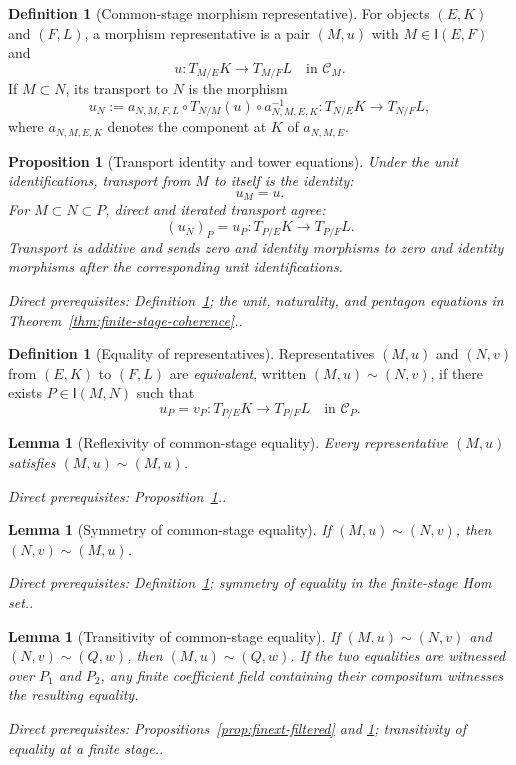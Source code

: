 \documentclass[10pt]{article}
\newtheorem{proposition}[theorem]{Proposition}
\newtheorem{lemma}[theorem]{Lemma}
\theoremstyle{definition}
\newtheorem{definition}[theorem]{Definition}
\newcommand{\depends}[1]{\par\smallskip\noindent\textit{Direct prerequisites:} #1.}
\begin{document}
\begin{definition}[Common-stage morphism representative]
\label{def:morphism-representative}
For objects $(E,K)$ and $(F,L)$, a morphism representative is a pair
$(M,u)$ with $M\in\mathsf I(E,F)$ and
\[
 u:T_{M/E}K\longrightarrow T_{M/F}L
 \quad\text{in }\mathcal C_M.
\]
If $M\subset N$, its transport to $N$ is the morphism
\[
 u_N:=
 a_{N,M,F,L}\circ T_{N/M}(u)\circ a_{N,M,E,K}^{-1}:
 T_{N/E}K\longrightarrow T_{N/F}L,
\]
where $a_{N,M,E,K}$ denotes the component at $K$ of
$a_{N,M,E}$.
\end{definition}

\begin{proposition}[Transport identity and tower equations]
\label{prop:transport-tower}
Under the unit identifications, transport from $M$ to itself is the identity:
\[
 u_M=u.
\]
For $M\subset N\subset P$, direct and iterated transport agree:
\[
 (u_N)_P=u_P:
 T_{P/E}K\longrightarrow T_{P/F}L.
\]
Transport is additive and sends zero and identity morphisms to zero and
identity morphisms after the corresponding unit identifications.
\depends{Definition~\ref{def:morphism-representative}; the unit, naturality,
and pentagon equations in Theorem~\ref{thm:finite-stage-coherence}.}
\end{proposition}

\begin{definition}[Equality of representatives]\label{def:representative-equality}
Representatives $(M,u)$ and $(N,v)$ from $(E,K)$ to $(F,L)$ are
\emph{equivalent}, written $(M,u)\sim(N,v)$, if there exists
$P\in\mathsf I(M,N)$ such that
\[
 u_P=v_P:T_{P/E}K\longrightarrow T_{P/F}L
 \quad\text{in }\mathcal C_P.
\]
\end{definition}

\begin{lemma}[Reflexivity of common-stage equality]
\label{lem:equality-reflexive}
Every representative $(M,u)$ satisfies $(M,u)\sim(M,u)$.
\depends{Proposition~\ref{prop:transport-tower}.}
\end{lemma}

\begin{lemma}[Symmetry of common-stage equality]
\label{lem:equality-symmetric}
If $(M,u)\sim(N,v)$, then $(N,v)\sim(M,u)$.
\depends{Definition~\ref{def:representative-equality}; symmetry of equality
in the finite-stage Hom set.}
\end{lemma}

\begin{lemma}[Transitivity of common-stage equality]
\label{lem:equality-transitive}
If $(M,u)\sim(N,v)$ and $(N,v)\sim(Q,w)$, then $(M,u)\sim(Q,w)$.
If the two equalities are witnessed over $P_1$ and $P_2$, any finite coefficient field
containing their compositum witnesses the resulting equality.
\depends{Propositions~\ref{prop:finext-filtered} and
\ref{prop:transport-tower}; transitivity of equality at a finite stage.}
\end{lemma}
\end{document}
